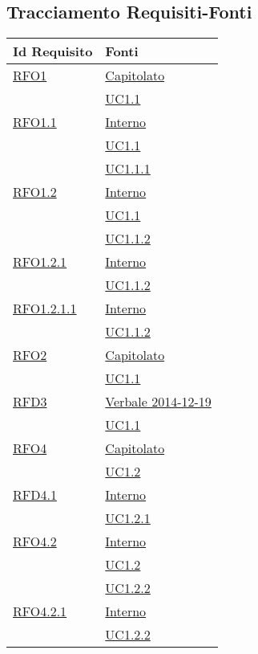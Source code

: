 \subsection{Tracciamento Requisiti-Fonti}
\normalsize
\begin{longtable}{|>{\centering}m{5cm}|m{5cm}<{\centering}|}
\hline
\textbf{Id Requisito} & \textbf{Fonti}\\
\hline
\endhead
\hyperlink{RFO1}{RFO1} & \hyperlink{Capitolato}{Capitolato}\\
& \hyperref[UC1.1]{UC1.1}\\ \hline
\hyperlink{RFO1.1}{RFO1.1} & \hyperlink{Interno}{Interno}\\
& \hyperref[UC1.1]{UC1.1}\\
& \hyperref[UC1.1.1]{UC1.1.1}\\ \hline
\hyperlink{RFO1.2}{RFO1.2} & \hyperlink{Interno}{Interno}\\
& \hyperref[UC1.1]{UC1.1}\\
& \hyperref[UC1.1.2]{UC1.1.2}\\ \hline
\hyperlink{RFO1.2.1}{RFO1.2.1} & \hyperlink{Interno}{Interno}\\
& \hyperref[UC1.1.2]{UC1.1.2}\\ \hline
\hyperlink{RFO1.2.1.1}{RFO1.2.1.1} & \hyperlink{Interno}{Interno}\\
& \hyperref[UC1.1.2]{UC1.1.2}\\ \hline
\hyperlink{RFO2}{RFO2} & \hyperlink{Capitolato}{Capitolato}\\
& \hyperref[UC1.1]{UC1.1}\\ \hline
\hyperlink{RFD3}{RFD3} & \hyperlink{Verbale 2014-12-19}{Verbale 2014-12-19}\\
& \hyperref[UC1.1]{UC1.1}\\ \hline
\hyperlink{RFO4}{RFO4} & \hyperlink{Capitolato}{Capitolato}\\
& \hyperref[UC1.2]{UC1.2}\\ \hline
\hyperlink{RFD4.1}{RFD4.1} & \hyperlink{Interno}{Interno}\\
& \hyperref[UC1.2.1]{UC1.2.1}\\ \hline
\hyperlink{RFO4.2}{RFO4.2} & \hyperlink{Interno}{Interno}\\
& \hyperref[UC1.2]{UC1.2}\\
& \hyperref[UC1.2.2]{UC1.2.2}\\ \hline
\hyperlink{RFO4.2.1}{RFO4.2.1} & \hyperlink{Interno}{Interno}\\
& \hyperref[UC1.2.2]{UC1.2.2}\\

\end{longtable}
